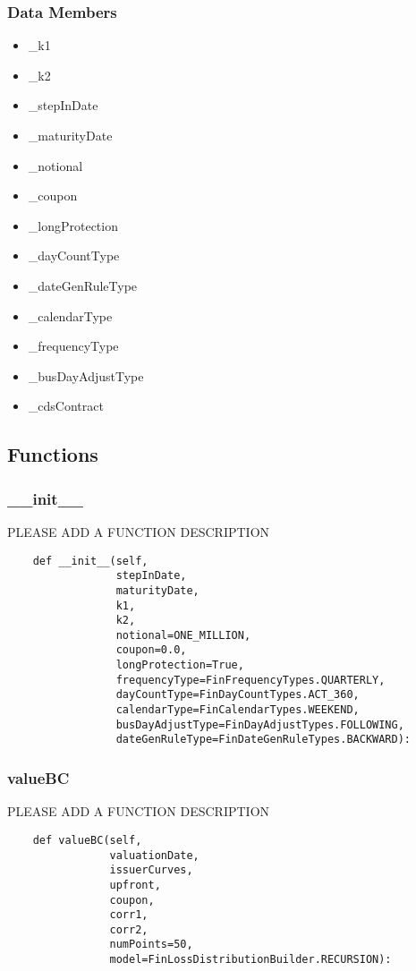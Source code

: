 \documentclass[twoside,11pt]{book}
\begin{document}
\subsubsection*{Data Members}
\begin{itemize}
\item{\_k1}
\item{\_k2}
\item{\_stepInDate}
\item{\_maturityDate}
\item{\_notional}
\item{\_coupon}
\item{\_longProtection}
\item{\_dayCountType}
\item{\_dateGenRuleType}
\item{\_calendarType}
\item{\_frequencyType}
\item{\_busDayAdjustType}
\item{\_cdsContract}
\end{itemize}

\subsection*{Functions}

\subsubsection*{{\bf \_\_init\_\_}}
PLEASE ADD A FUNCTION DESCRIPTION

\begin{lstlisting}
    def __init__(self,
                 stepInDate,
                 maturityDate,
                 k1,
                 k2,
                 notional=ONE_MILLION,
                 coupon=0.0,
                 longProtection=True,
                 frequencyType=FinFrequencyTypes.QUARTERLY,
                 dayCountType=FinDayCountTypes.ACT_360,
                 calendarType=FinCalendarTypes.WEEKEND,
                 busDayAdjustType=FinDayAdjustTypes.FOLLOWING,
                 dateGenRuleType=FinDateGenRuleTypes.BACKWARD):
\end{lstlisting}

\subsubsection*{{\bf valueBC}}
PLEASE ADD A FUNCTION DESCRIPTION

\begin{lstlisting}
    def valueBC(self,
                valuationDate,
                issuerCurves,
                upfront,
                coupon,
                corr1,
                corr2,
                numPoints=50,
                model=FinLossDistributionBuilder.RECURSION):
\end{lstlisting}
\end{document}
